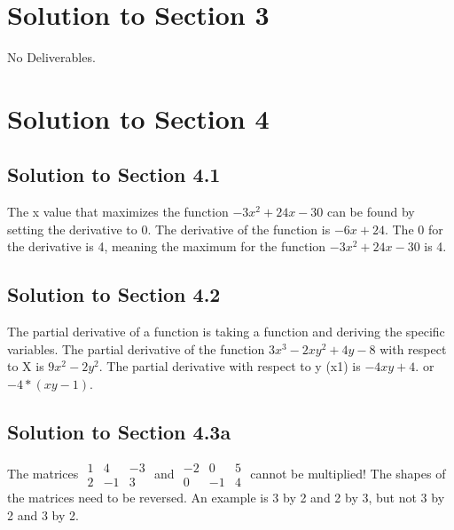 \documentclass[a4paper]{article}
\begin{document}
\section{Solution to Section 3}
No Deliverables.

\section{Solution to Section 4}
\subsection{Solution to Section 4.1}
The  x value that maximizes the function $-3x^2 + 24x -30$ can be found by setting the derivative to 0. The derivative of the function is $-6x + 24$. The 0 for the derivative is 4, meaning the maximum for the function $-3x^2 + 24x -30$ is 4.

\subsection{Solution to Section 4.2}
The partial derivative of a function is taking a function and deriving the specific variables. The partial derivative of the function $3x^3 -2xy^2+4y-8$ with respect to X is $9x^2 - 2y^2$. The partial derivative with respect to y (x1) is $-4xy+4$. or $-4 * (xy-1)$.


\subsection{Solution to Section 4.3a}
The matrices 
$\begin{matrix}
1 &4 &-3\\
2 &-1 &3
\end{matrix}$ and
$\begin{matrix}
-2 &0 &5\\
0 &-1 &4
\end{matrix}$ cannot be multiplied! The shapes of the matrices need to be reversed. An example is 3 by 2 and 2 by 3, but not 3 by 2 and 3 by 2. 
\end{document}
